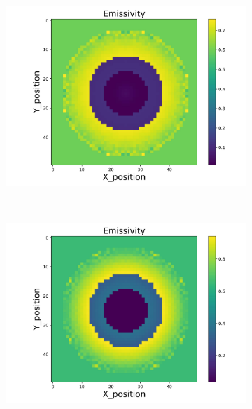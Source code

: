 \begin{figure}[p]
\begin{minipage}{\textwidth}
        \begin{subfigure}{0.325\textwidth}
            \centering
            \includegraphics[width=\textwidth]{figures/raw_data/21/linear/emi_cal.jpg}
        \end{subfigure}
    \end{minipage}\\
    \begin{minipage}{\textwidth}
        \centering
        \begin{subfigure}{0.325\textwidth}
            \centering
            \includegraphics[width=\textwidth]{figures/raw_data/22/linear/emi_cal.jpg}
        \end{subfigure}

\end{minipage}
\end{figure}
